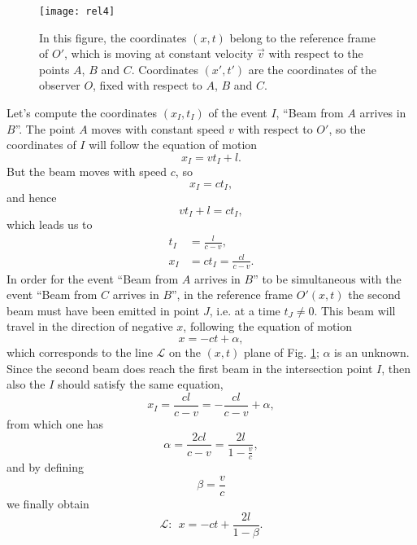 \begin{figure}
  \centering
  \texttt{[image: rel4]}
  \caption{In this figure, the coordinates $(x,t)$ belong to the reference frame of $O'$, which is moving at constant velocity $\vec{v}$ with respect to the points $A$, $B$ and $C$. Coordinates $(x',t')$ are the coordinates of the observer $O$, fixed with respect to $A$, $B$ and $C$.}  \label{fig:rel4}
\end{figure}

Let's compute the coordinates $(x_I,t_I)$ of the event $I$, ``Beam from $A$ arrives in $B$''. The point $A$ moves with constant speed $v$ with respect to $O'$, so the coordinates of $I$ will follow the equation of motion
\[x_I=vt_I+l.\]
But the beam moves with speed $c$, so
\[x_I=ct_I,\]
and hence
\[vt_I+l=ct_I,\]
which leads us to
\begin{align}
  t_I&=\frac{l}{c-v},\\
  x_I&=ct_I=\frac{cl}{c-v}.
\end{align}
In order for the event ``Beam from $A$ arrives in $B$'' to be simultaneous with the event ``Beam from $C$ arrives in $B$'', in the reference frame $O'(x,t)$ the second beam must have been emitted in point $J$, i.e. at a time $t_J\neq0$. This beam will travel in the direction of negative $x$, following the equation of motion
\[x=-ct+\alpha,\]
which corresponds to the line $\mathcal{L}$ on the $(x,t)$ plane of Fig. \ref{fig:rel4}; $\alpha$ is an unknown.
Since the second beam does reach the first beam in the intersection point $I$, then also the $I$ should satisfy the same equation,
\[x_I=\frac{cl}{c-v} = -\frac{cl}{c-v} + \alpha,\]
from which one has
\[\alpha = \frac{2cl}{c-v} = \frac{2l}{1-\frac{v}{c}},\]
and by defining
\begin{equation}
  \label{eq:beta}
  \beta = \frac{v}{c}
\end{equation}
we finally obtain
\begin{equation}
  \mathcal{L}:\ \ x=-ct+\frac{2l}{1-\beta}.
\end{equation}

